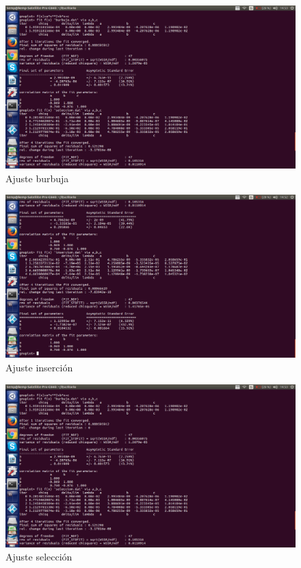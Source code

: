 \documentclass[a4paper, 11pt]{article}
\begin{document}
\begin{figure}[!hbp]
	\includegraphics[width=\textwidth]{gnuplot_burbuja.png}
	\caption{Ajuste burbuja\label{ajust1}}
\end{figure}
\begin{figure}[!hbp]
	\includegraphics[width=\textwidth]{gnuplot_insercion.png}
	\caption{Ajuste inserción\label{ajust2}}
\end{figure}
\begin{figure}[!hbp]
	\includegraphics[width=\textwidth]{gnuplot_burbuja.png}
	\caption{Ajuste selección\label{ajust3}}
\end{figure}
\end{document}
